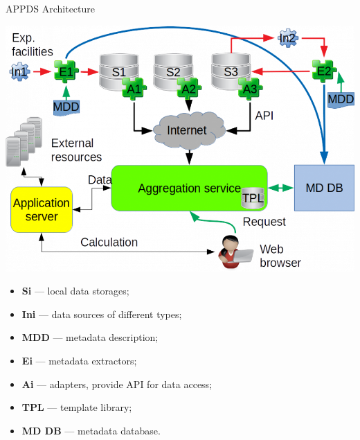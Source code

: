 \begin{frame}{APPDS Architecture}
\begin{minipage}[c]{0.63\textwidth}
  \includegraphics[width=1\textwidth]{pics/arch_appds.png}
\end{minipage}
\hfill
\begin{minipage}[c]{0.36\textwidth}
  \small
  \begin{itemize}
    \setlength{\itemsep}{0pt}
    \item\textbf{Si} — local data storages;
    \item\textbf{Ini} — data sources of different types;
    \item\textbf{MDD} — metadata description;
    \item\textbf{Ei} — metadata extractors;
    \item\textbf{Ai} — adapters, provide API for data access;
    \item\textbf{TPL} — template library;
    \item\textbf{MD DB} — metadata database.
  \end{itemize}
\end{minipage}
\end{frame}



